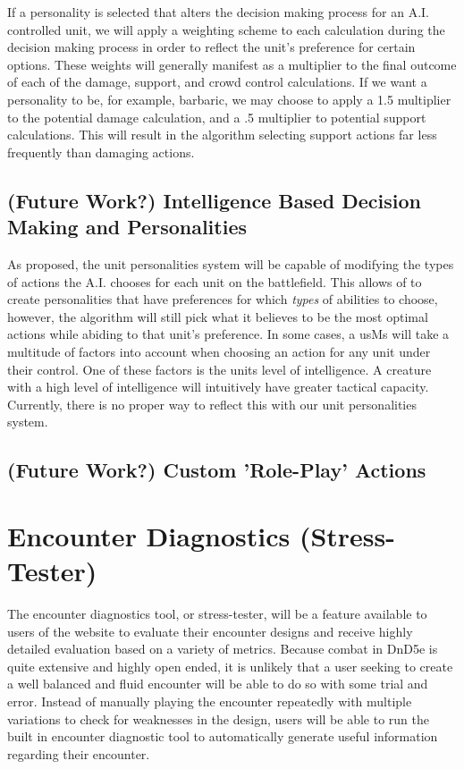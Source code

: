 \documentclass[12pt,a4paper]{report}
\begin{document}
		If a personality is selected that alters the decision making process for an A.I. controlled unit, we will apply a weighting scheme to each calculation during the decision making process in order to reflect the unit's preference for certain options. These weights will generally manifest as a multiplier to the final outcome of each of the damage, support, and crowd control calculations. If we want a personality to be, for example, barbaric, we may choose to apply a 1.5 multiplier to the potential damage calculation, and a .5 multiplier to potential support calculations. This will result in the algorithm selecting support actions far less frequently than damaging actions. 
		
		\subsection{(Future Work?) Intelligence Based Decision Making and Personalities}
		As proposed, the unit personalities system will be capable of modifying the types of actions the A.I. chooses for each unit on the battlefield. This allows of to create personalities that have preferences for which \textit{types} of abilities to choose, however, the algorithm will still pick what it believes to be the most optimal actions while abiding to that unit's preference. In some cases, a usMs will take a multitude of factors into account when choosing an action for any unit under their control. One of these factors is the units level of intelligence. A creature with a high level of intelligence will intuitively have greater tactical capacity. Currently, there is no proper way to reflect this with our unit personalities system. 
		
		
		
		\subsection{(Future Work?) Custom 'Role-Play' Actions}
	
	\section{Encounter Diagnostics (Stress-Tester)}
	The encounter diagnostics tool, or stress-tester, will be a feature available to users of the website to evaluate their encounter designs and receive highly detailed evaluation based on a variety of metrics. Because combat in DnD5e is quite extensive and highly open ended, it is unlikely that a user seeking to create a well balanced and fluid encounter will be able to do so with some trial and error. Instead of manually playing the encounter repeatedly with multiple variations to check for weaknesses in the design, users will be able to run the built in encounter diagnostic tool to automatically generate useful information regarding their encounter. 
	
\end{document}
